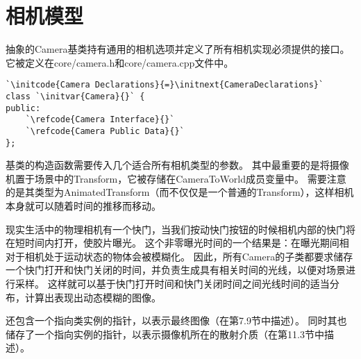 \section{相机模型}\label{sec:相机模型}
抽象的Camera基类持有通用的相机选项并定义了所有相机实现必须提供的接口。它被定义在core/camera.h和core/camera.cpp文件中。
\begin{lstlisting}
`\initcode{Camera Declarations}{=}\initnext{CameraDeclarations}`
class `\initvar{Camera}{}` {
public:
    `\refcode{Camera Interface}{}`
    `\refcode{Camera Public Data}{}`
};

\end{lstlisting}
基类的构造函数需要传入几个适合所有相机类型的参数。
其中最重要的是将摄像机置于场景中的Transform，它被存储在CameraToWorld成员变量中。
需要注意的是其类型为AnimatedTransform（而不仅仅是一个普通的Transform），这样相机本身就可以随着时间的推移而移动。

现实生活中的物理相机有一个快门，当我们按动快门按钮的时候相机内部的快门将在短时间内打开，使胶片曝光。
这个非零曝光时间的一个结果是：在曝光期间相对于相机处于运动状态的物体会被模糊化。
因此，所有Camera的子类都要求储存一个快门打开和快门关闭的时间，并负责生成具有相关时间的光线，以便对场景进行采样。
这样就可以基于快门打开时间和快门关闭时间之间光线时间的适当分布，计算出表现出动态模糊的图像。

还包含一个指向类实例的指针，以表示最终图像（在第7.9节中描述）。
同时其也储存了一个指向实例的指针，以表示摄像机所在的散射介质（在第11.3节中描述）。

